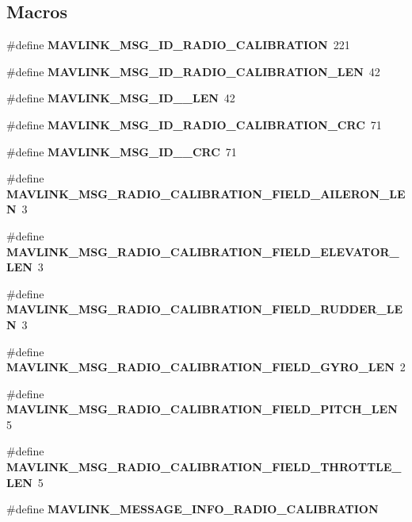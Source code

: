 \subsection*{Macros}
\begin{DoxyCompactItemize}
\item 
\#define \textbf{ M\+A\+V\+L\+I\+N\+K\+\_\+\+M\+S\+G\+\_\+\+I\+D\+\_\+\+R\+A\+D\+I\+O\+\_\+\+C\+A\+L\+I\+B\+R\+A\+T\+I\+ON}~221
\item 
\#define \textbf{ M\+A\+V\+L\+I\+N\+K\+\_\+\+M\+S\+G\+\_\+\+I\+D\+\_\+\+R\+A\+D\+I\+O\+\_\+\+C\+A\+L\+I\+B\+R\+A\+T\+I\+O\+N\+\_\+\+L\+EN}~42
\item 
\#define \textbf{ M\+A\+V\+L\+I\+N\+K\+\_\+\+M\+S\+G\+\_\+\+I\+D\+\_\+\_\+\+L\+EN}~42
\item 
\#define \textbf{ M\+A\+V\+L\+I\+N\+K\+\_\+\+M\+S\+G\+\_\+\+I\+D\+\_\+\+R\+A\+D\+I\+O\+\_\+\+C\+A\+L\+I\+B\+R\+A\+T\+I\+O\+N\+\_\+\+C\+RC}~71
\item 
\#define \textbf{ M\+A\+V\+L\+I\+N\+K\+\_\+\+M\+S\+G\+\_\+\+I\+D\+\_\+\_\+\+C\+RC}~71
\item 
\#define \textbf{ M\+A\+V\+L\+I\+N\+K\+\_\+\+M\+S\+G\+\_\+\+R\+A\+D\+I\+O\+\_\+\+C\+A\+L\+I\+B\+R\+A\+T\+I\+O\+N\+\_\+\+F\+I\+E\+L\+D\+\_\+\+A\+I\+L\+E\+R\+O\+N\+\_\+\+L\+EN}~3
\item 
\#define \textbf{ M\+A\+V\+L\+I\+N\+K\+\_\+\+M\+S\+G\+\_\+\+R\+A\+D\+I\+O\+\_\+\+C\+A\+L\+I\+B\+R\+A\+T\+I\+O\+N\+\_\+\+F\+I\+E\+L\+D\+\_\+\+E\+L\+E\+V\+A\+T\+O\+R\+\_\+\+L\+EN}~3
\item 
\#define \textbf{ M\+A\+V\+L\+I\+N\+K\+\_\+\+M\+S\+G\+\_\+\+R\+A\+D\+I\+O\+\_\+\+C\+A\+L\+I\+B\+R\+A\+T\+I\+O\+N\+\_\+\+F\+I\+E\+L\+D\+\_\+\+R\+U\+D\+D\+E\+R\+\_\+\+L\+EN}~3
\item 
\#define \textbf{ M\+A\+V\+L\+I\+N\+K\+\_\+\+M\+S\+G\+\_\+\+R\+A\+D\+I\+O\+\_\+\+C\+A\+L\+I\+B\+R\+A\+T\+I\+O\+N\+\_\+\+F\+I\+E\+L\+D\+\_\+\+G\+Y\+R\+O\+\_\+\+L\+EN}~2
\item 
\#define \textbf{ M\+A\+V\+L\+I\+N\+K\+\_\+\+M\+S\+G\+\_\+\+R\+A\+D\+I\+O\+\_\+\+C\+A\+L\+I\+B\+R\+A\+T\+I\+O\+N\+\_\+\+F\+I\+E\+L\+D\+\_\+\+P\+I\+T\+C\+H\+\_\+\+L\+EN}~5
\item 
\#define \textbf{ M\+A\+V\+L\+I\+N\+K\+\_\+\+M\+S\+G\+\_\+\+R\+A\+D\+I\+O\+\_\+\+C\+A\+L\+I\+B\+R\+A\+T\+I\+O\+N\+\_\+\+F\+I\+E\+L\+D\+\_\+\+T\+H\+R\+O\+T\+T\+L\+E\+\_\+\+L\+EN}~5
\item 
\#define \textbf{ M\+A\+V\+L\+I\+N\+K\+\_\+\+M\+E\+S\+S\+A\+G\+E\+\_\+\+I\+N\+F\+O\+\_\+\+R\+A\+D\+I\+O\+\_\+\+C\+A\+L\+I\+B\+R\+A\+T\+I\+ON}
\end{DoxyCompactItemize}
